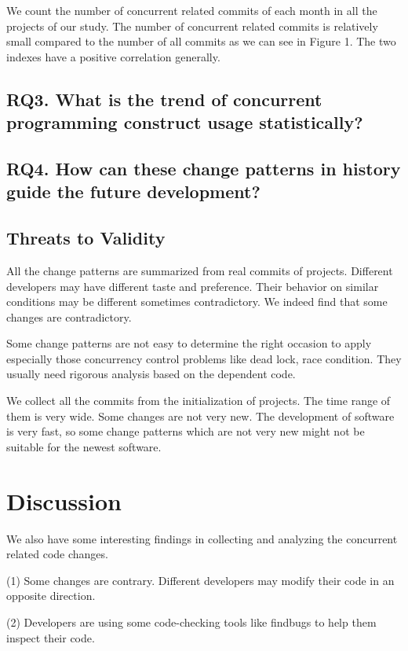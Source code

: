 \documentclass[conference]{IEEEtran}
\begin{document}
We count the number of concurrent related commits of each month in all the projects of our study. The number of concurrent related commits is relatively small compared to the number of all commits as we can see in Figure 1. The two indexes have a positive correlation generally.

\subsection{RQ3. What is the trend of concurrent programming construct usage statistically?}

\subsection{RQ4. How can these change patterns in history guide the future development?}

\subsection{Threats to Validity}

All the change patterns are summarized from real commits of projects. Different developers may have different taste and preference. Their behavior on similar conditions may be different sometimes contradictory. We indeed find that some changes are contradictory.

Some change patterns are not easy to determine the right occasion to apply especially those concurrency control problems like dead lock, race condition. They usually need rigorous analysis based on the dependent code.

We collect all the commits from the initialization of projects. The time range of them is very wide. Some changes are not very new. The development of software is very fast, so some change patterns which are not very new might not be suitable for the newest software.

\section{Discussion}
We also have some interesting findings in collecting and analyzing the concurrent related code changes.

(1) Some changes are contrary. Different developers may modify their code in an opposite direction.

(2) Developers are using some code-checking tools like findbugs to help them inspect their code.
\end{document}
